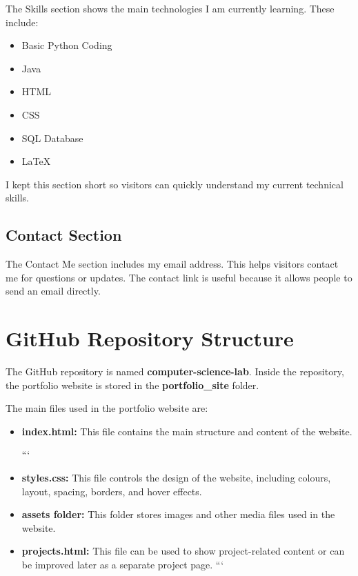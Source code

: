 \documentclass[12pt,a4paper]{article}
\begin{document}
The Skills section shows the main technologies I am currently learning. These include:

\begin{itemize}
\item Basic Python Coding
\item Java
\item HTML
\item CSS
\item SQL Database
\item LaTeX
\end{itemize}

I kept this section short so visitors can quickly understand my current technical skills.

\subsection{Contact Section}

The Contact Me section includes my email address. This helps visitors contact me for questions or updates. The contact link is useful because it allows people to send an email directly.

\section{GitHub Repository Structure}

The GitHub repository is named \textbf{computer-science-lab}. Inside the repository, the portfolio website is stored in the \textbf{portfolio_site} folder.

The main files used in the portfolio website are:

\begin{itemize}
\item \textbf{index.html:} This file contains the main structure and content of the website.

```
\item \textbf{styles.css:} This file controls the design of the website, including colours, layout, spacing, borders, and hover effects.

\item \textbf{assets folder:} This folder stores images and other media files used in the website.

\item \textbf{projects.html:} This file can be used to show project-related content or can be improved later as a separate project page.
```

\end{itemize}
\end{document}
